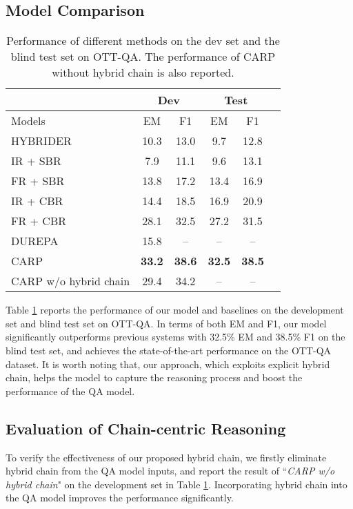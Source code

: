 \documentclass[11pt]{article}
\begin{document}
\subsection{Model Comparison}
	\begin{table}[t]
		\small
		\begin{tabular}{lccccc}
			\hline
			& \multicolumn{2}{c}{Dev} & \multicolumn{2}{c}{Test} \\ \hline
			Models                                    & EM         & F1         & EM          & F1         \\ \hline
HYBRIDER & 10.3       & 13.0       & 9.7         & 12.8       \\
			IR + SBR  & 7.9        & 11.1       & 9.6         & 13.1       \\
			FR + SBR    & 13.8       & 17.2       & 13.4        & 16.9       \\
			IR + CBR   & 14.4       & 18.5       & 16.9        & 20.9       \\
			FR + CBR     & 28.1       & 32.5       & 27.2        & 31.5       \\
			DUREPA        & 15.8       & --          & --           & --          \\ \hline
			CARP                             & \textbf{33.2}       & \textbf{38.6}       &      \textbf{32.5}  & \textbf{38.5}           \\
			CARP w/o hybrid chain   & 29.4       & 34.2 & -- & -- \\ \hline
		\end{tabular}
\caption{Performance of different methods on the dev set and the blind test set on OTT-QA. The performance of CARP without hybrid chain is also reported.}
		\label{tab:overall-performance}
	\end{table}
Table \ref{tab:overall-performance} reports the performance of our model and baselines on the development set and blind test set on OTT-QA. 
In terms of both EM and F1, our model significantly outperforms previous systems with 32.5\% EM and 38.5\% F1 on the blind test set, and achieves the state-of-the-art performance on the OTT-QA dataset. 
	It is worth noting that, our approach, which exploits explicit hybrid chain, helps the model to capture the reasoning process and boost the performance of the QA model. 




	\subsection{Evaluation of Chain-centric Reasoning}
To verify the effectiveness of our proposed hybrid chain, we firstly eliminate hybrid chain from the QA model inputs, and report the result of ``\textit{CARP w/o hybrid chain}" on the development set in Table \ref{tab:overall-performance}.
	 Incorporating hybrid chain into the QA model improves the performance significantly. 
	
\end{document}
